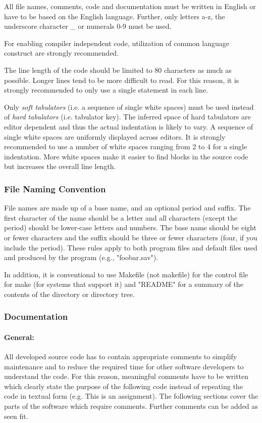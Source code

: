 All file names, comments, code and documentation must be written in English or have to be based on the English language. Further, only letters a-z, the underscore character \_ or numerals 0-9 must be used.

For enabling compiler independent code, utilization of common language construct are strongly recommended.

The line length of the code should be limited to 80 characters as much as possible. Longer lines tend to be more difficult to read. For this reason, it is strongly recommended to only use a single statement in each line.

Only \textit{soft tabulators} (i.e. a sequence of single white spaces) must be used instead of \textit{hard tabulators} (i.e. tabulator key).
The inferred space of hard tabulators are editor dependent and thus the actual indentation is likely to vary.
A sequence of single white spaces are uniformly displayed across editors.
It is strongly recommended to use a number of white spaces ranging from 2 to 4 for a single indentation.
More white spaces make it easier to find blocks in the source code but increases the overall line length.


\subsubsection{File Naming Convention}

File names are made up of a base name, and an optional period and suffix. The first character of the name should be a letter and all characters (except the period) should be lower-case letters and numbers. The base name should be eight or fewer characters and the suffix should be three or fewer characters (four, if you include the period). These rules apply to both program files and default files used and produced by the program (e.g., "foobar.sav").

In addition, it is conventional to use Makefile (not makefile) for the control file for make (for systems that support it) and "README" for a summary of the contents of the directory or directory tree.


\subsubsection{Documentation}\label{C-Documentation}

\paragraph{General:}
All developed source code has to contain appropriate comments to simplify maintenance and to reduce the required time for other software developers to understand the code. For this reason, meaningful comments have to be written which clearly state the purpose of the following code instead of repeating the code in textual form (e.g. This is an assignment). The following sections cover the parts of the software which require comments. Further comments can be added as seen fit.

